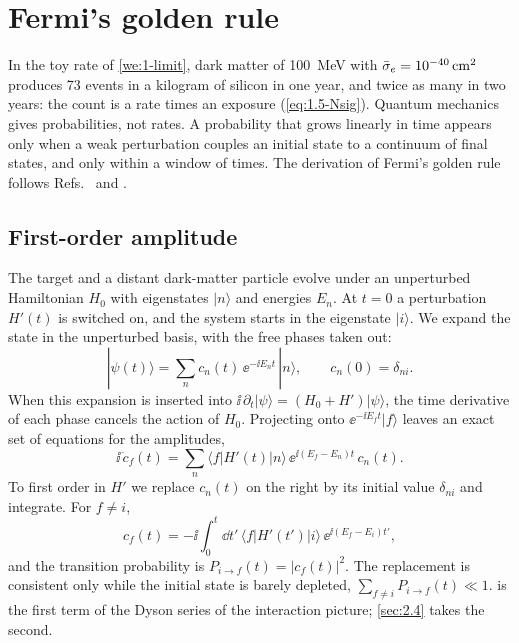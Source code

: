 \section{Fermi's golden rule}\label{sec:2.1}

In the toy rate of \cref{we:1-limit}, dark matter of \SI{100}{MeV} with $\bar{\sigma}_{e} = \SI{e-40}{cm^2}$ produces 73 events in a kilogram of silicon in one year, and twice as many in two years: the count is a rate times an exposure (\cref{eq:1.5-Nsig}). Quantum mechanics gives probabilities, not rates. A probability that grows linearly in time appears only when a weak perturbation couples an initial state to a continuum of final states, and only within a window of times. The derivation of Fermi's golden rule follows Refs.~\cite[Chap.~5]{sakurai2017modern} and \cite[Chap.~XIII]{cohentannoudji1977quantum}.

\subsection{First-order amplitude}

The target and a distant dark-matter particle evolve under an unperturbed Hamiltonian $H_0$ with eigenstates $|n\rangle$ and energies $E_n$. At $t = 0$ a perturbation $H'(t)$ is switched on, and the system starts in the eigenstate $|i\rangle$. We expand the state in the unperturbed basis, with the free phases taken out:
\begin{equation*}
  |\psi(t)\rangle = \sum_n c_n(t)\,\ee^{-\ii E_n t}\,|n\rangle, \qquad c_n(0) = \delta_{ni}.
\end{equation*}
When this expansion is inserted into $\ii\,\partial_t|\psi\rangle = (H_0 + H')|\psi\rangle$, the time derivative of each phase cancels the action of $H_0$. Projecting onto $\ee^{-\ii E_f t}|f\rangle$ leaves an exact set of equations for the amplitudes,
\begin{equation}
  \ii\,\dot c_f(t) = \sum_n \langle f|H'(t)|n\rangle\,\ee^{\ii(E_f - E_n)t}\,c_n(t).
  \label{eq:2.1-exact}
\end{equation}
To first order in $H'$ we replace $c_n(t)$ on the right by its initial value $\delta_{ni}$ and integrate. For $f \neq i$,
\begin{equation}
  c_f(t) = -\ii\int_0^t \dd t'\,\langle f|H'(t')|i\rangle\,\ee^{\ii(E_f - E_i)t'} ,
  \label{eq:2.1-c1}
\end{equation}
and the transition probability is $P_{i\to f}(t) = |c_f(t)|^2$. The replacement is consistent only while the initial state is barely depleted, $\sum_{f\neq i}P_{i\to f}(t) \ll 1$.  is the first term of the Dyson series of the interaction picture; \cref{sec:2.4} takes the second.

